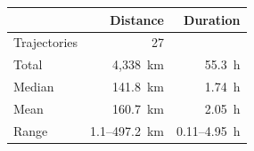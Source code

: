 \begin{tabular}{lrr}
\toprule
 & Distance & Duration \\
\midrule
Trajectories & 27 &  \\
Total & 4{,}338~km & 55.3~h \\
Median & 141.8~km & 1.74~h \\
Mean & 160.7~km & 2.05~h \\
Range & 1.1--497.2~km & 0.11--4.95~h \\
\bottomrule
\end{tabular}
